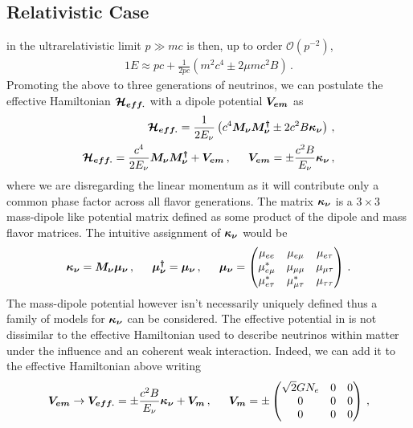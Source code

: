 \subsection{Relativistic Case}\label{rel}
\noindent{} in the ultrarelativistic limit $p\gg mc$ is then, up to order $\mathcal{O}(p^{-2})$,
\begin{alignat}{1}
	\label{eigen:3} E \approx pc + \frac{1}{2pc}\left(m^{2}c^{4}\pm2\mu mc^{2}B\right)\,.
\end{alignat}
Promoting the above to three generations of neutrinos, we can postulate the effective Hamiltonian $\boldsymbol{\mathcal{H}_{eff.}}$ with a dipole potential $\boldsymbol{V_{em}}$ as
\begin{alignat}{1}
	\label{heff:1} \bb{\mathcal{H}_{eff.}}=\frac{1}{2E_{\nu}}\left(c^{4}\bb{M_{\nu}}\bb{M_{\nu}^{\dagger}}\pm2c^{2}B\bb{\kappa_{\nu}}\right)\,,\\
	\label{heff:2} \bb{\mathcal{H}_{eff.}}=\frac{c^{4}}{2E_{\nu}}\bb{M_{\nu}}\bb{M_{\nu}^{\dagger}}+\bb{V_{em}}\,,\indent\bb{V_{em}}=\pm\frac{c^{2}B}{E_{\nu}}\bb{\kappa_{\nu}}\,,
\end{alignat}
where we are disregarding the linear momentum as it will contribute only a common phase factor across all flavor generations. \ar The matrix $\boldsymbol{\kappa_{\nu}}$ is a $3\times3$ mass-dipole like potential matrix defined as some product of the dipole and mass flavor matrices. The intuitive assignment of $\boldsymbol{\kappa_{\nu}}$ would be
\begin{alignat}{1}
	\label{kappa:1} \bb{\kappa_{\nu}} = \bb{M_\nu}\bb{\mu_{\nu}}\,,\indent\bb{\mu_{\nu}^{\dagger}}=\bb{\mu_{\nu}}\,,\indent\bb{\mu_{\nu}}=
	\begin{pmatrix}
		\mu_{ee} & \mu_{e\mu} & \mu_{e\tau} \\
		\mu_{e\mu}^{*} & \mu_{\mu\mu} & \mu_{\mu\tau} \\
		\mu_{e\tau}^{*} & \mu_{\mu\tau}^{*} & \mu_{\tau\tau}
	\end{pmatrix}\,.
\end{alignat}
The mass-dipole potential however isn't necessarily uniquely defined thus a family of models for $\boldsymbol{\kappa_{\nu}}$ can be considered. The effective potential in  is not dissimilar to the effective Hamiltonian used to describe neutrinos within matter under the influence and an coherent weak interaction. \ar Indeed, we can add it to the effective Hamiltonian above writing
\begin{alignat}{1}
	\label{matter:1} \bb{V_{em}}\rightarrow\bb{V_{eff.}}=\pm\frac{c^{2}B}{E_{\nu}}\bb{\kappa_{\nu}}+\bb{V_{m}}\,,\indent\bb{V_{m}}=\pm
	\begin{pmatrix}
		\sqrt{2}GN_{e} & 0 & 0\\
		0 & 0 & 0\\
		0 & 0 & 0
	\end{pmatrix}\,,
\end{alignat}
